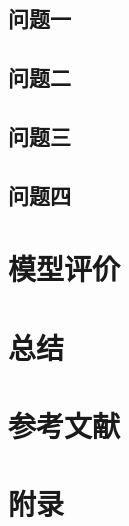 \documentclass[UTF8]{ctexart}
\begin{document}
	\subsection{问题一}
	\subsection{问题二}
	\subsection{问题三}
	\subsection{问题四}
	
	\section{模型评价}

	\section{总结}
	
	\section{参考文献}

	\section{附录}
	\begin{appendices}
		
	\end{appendices}
\end{document}
